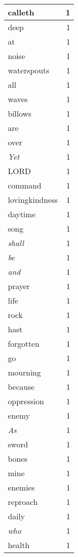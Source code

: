 \begin{center}
\begin{longtable}{l|r}
calleth & 1 \\ \hline
deep & 1 \\ \hline
at & 1 \\ \hline
noise & 1 \\ \hline
waterspouts & 1 \\ \hline
all & 1 \\ \hline
waves & 1 \\ \hline
billows & 1 \\ \hline
are & 1 \\ \hline
over & 1 \\ \hline
\emph{Yet} & 1 \\ \hline
LORD & 1 \\ \hline
command & 1 \\ \hline
lovingkindness & 1 \\ \hline
daytime & 1 \\ \hline
song & 1 \\ \hline
\emph{shall} & 1 \\ \hline
\emph{be} & 1 \\ \hline
\emph{and} & 1 \\ \hline
prayer & 1 \\ \hline
life & 1 \\ \hline
rock & 1 \\ \hline
hast & 1 \\ \hline
forgotten & 1 \\ \hline
go & 1 \\ \hline
mourning & 1 \\ \hline
because & 1 \\ \hline
oppression & 1 \\ \hline
enemy & 1 \\ \hline
\emph{As} & 1 \\ \hline
sword & 1 \\ \hline
bones & 1 \\ \hline
mine & 1 \\ \hline
enemies & 1 \\ \hline
reproach & 1 \\ \hline
daily & 1 \\ \hline
\emph{who} & 1 \\ \hline
health & 1 \\ \hline
\end{longtable}
\end{center}



\normalsize



